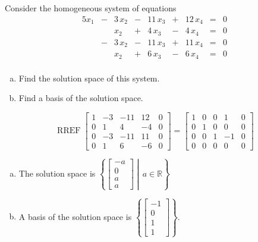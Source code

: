 
\begin{exerciseStatement}


Consider the homogeneous system of equations 
\begin{alignat*}{5} x_{1} &-& 3 \, x_{2} &-& 11 \, x_{3} &+& 12 \, x_{4} &=& 0 \\ & & x_{2} &+& 4 \, x_{3} &-& 4 \, x_{4} &=& 0 \\ &-& 3 \, x_{2} &-& 11 \, x_{3} &+& 11 \, x_{4} &=& 0 \\ & & x_{2} &+& 6 \, x_{3} &-& 6 \, x_{4} &=& 0 \\ \end{alignat*}
            


\begin{enumerate}[(a)]
\item  Find the solution space of this system.
\item  Find a basis of the solution space.
\end{enumerate}
    
\end{exerciseStatement}
    
\begin{exerciseAnswer} 


\[\operatorname{RREF} \left[\begin{array}{cccc|c}
1 & -3 & -11 & 12 & 0 \\
0 & 1 & 4 & -4 & 0 \\
0 & -3 & -11 & 11 & 0 \\
0 & 1 & 6 & -6 & 0
\end{array}\right] = \left[\begin{array}{cccc|c}
1 & 0 & 0 & 1 & 0 \\
0 & 1 & 0 & 0 & 0 \\
0 & 0 & 1 & -1 & 0 \\
0 & 0 & 0 & 0 & 0
\end{array}\right] \]


\begin{enumerate}[(a)]
\item The solution space is \( \left\{ \left[\begin{array}{c}
-a \\
0 \\
a \\
a
\end{array}\right] \middle|\,a\in\mathbb{R}\right\} \)
\item A basis of the solution space is \( \left\{ \left[\begin{array}{c}
-1 \\
0 \\
1 \\
1
\end{array}\right] \right\} \).
\end{enumerate}
    
\end{exerciseAnswer}
    
